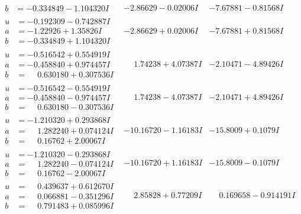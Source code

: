 \documentclass[1p]{elsarticle_modified}
\theoremstyle{definition}
\begin{document}
$$\begin{array}{c|c|c}
\begin{aligned}
b &= -0.334849 - 1.104320 I\end{aligned}
 & -2.86629 - 0.02006 I & -7.67881 - 0.81568 I \\ \hline\begin{aligned}
u &= -0.192309 - 0.742887 I \\
a &= -1.22926 + 1.35826 I \\
b &= -0.334849 + 1.104320 I\end{aligned}
 & -2.86629 + 0.02006 I & -7.67881 + 0.81568 I \\ \hline\begin{aligned}
u &= -0.516542 + 0.554919 I \\
a &= -0.458840 + 0.974457 I \\
b &= \phantom{-}0.630180 + 0.307536 I\end{aligned}
 & \phantom{-}1.74238 + 4.07387 I & -2.10471 - 4.89426 I \\ \hline\begin{aligned}
u &= -0.516542 - 0.554919 I \\
a &= -0.458840 - 0.974457 I \\
b &= \phantom{-}0.630180 - 0.307536 I\end{aligned}
 & \phantom{-}1.74238 - 4.07387 I & -2.10471 + 4.89426 I \\ \hline\begin{aligned}
u &= -1.210320 + 0.293868 I \\
a &= \phantom{-}1.282240 + 0.074124 I \\
b &= \phantom{-}0.16762 + 2.00067 I\end{aligned}
 & -10.16720 - 1.16183 I & -15.8009 + 0.1079 I \\ \hline\begin{aligned}
u &= -1.210320 - 0.293868 I \\
a &= \phantom{-}1.282240 - 0.074124 I \\
b &= \phantom{-}0.16762 - 2.00067 I\end{aligned}
 & -10.16720 + 1.16183 I & -15.8009 - 0.1079 I \\ \hline\begin{aligned}
u &= \phantom{-}0.439637 + 0.612670 I \\
a &= \phantom{-}0.066881 - 0.351296 I \\
b &= \phantom{-}0.791483 + 0.085996 I\end{aligned}
 & \phantom{-}2.85828 + 0.77209 I & \phantom{-}0.169658 - 0.914191 I \\ \hline\begin{aligned}

\end{aligned}
\end{array}$$
\end{document}
